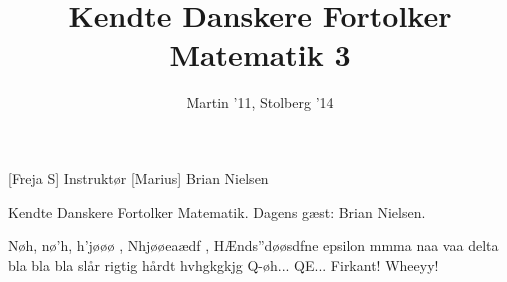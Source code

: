\documentclass[a4paper,11pt]{article}
\title{Kendte Danskere Fortolker Matematik 3}
\author{Martin '11, Stolberg '14}
\begin{document}
\maketitle

\begin{roles}
[Freja S] Instruktør
[Marius] Brian Nielsen
\end{roles}


\begin{sketch}
 Kendte Danskere Fortolker Matematik. Dagens gæst: Brian Nielsen.


 Nøh, nø'h, h'jøøø , Nhjøøeaædf , HÆnds''døøsdfne epsilon mmma naa vaa delta
bla bla bla slår rigtig hårdt hvhgkgkjg Q-øh... QE... Firkant! Wheeyy!

\end{sketch}
\end{document}
